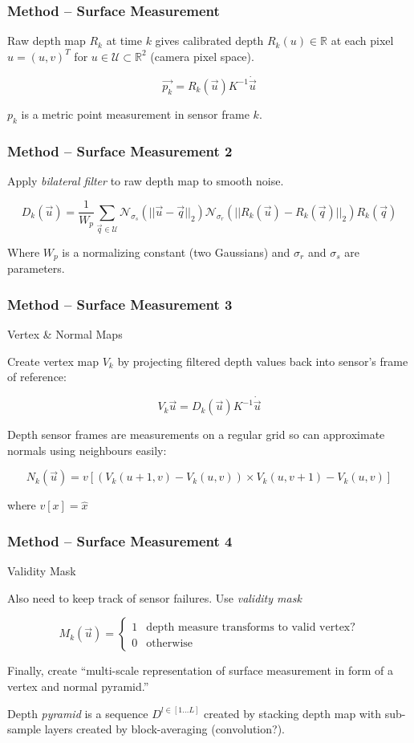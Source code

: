 \begin{frame}
\frametitle{Method -- Surface Measurement}

Raw depth map $R_k$ at time $k$ gives calibrated depth $R_k(u) \in \mathbb{R}$ at
each pixel $u = (u,v)^T$ for $u \in \mathcal{U} \subset \mathbb{R}^2$ (camera pixel space).

\[ \vec{p_k} = R_k(\vec{u})K^{-1}\dot{\vec{u}} \]

$p_k$ is a metric point measurement in sensor frame $k$.

\end{frame}

\begin{frame}
\frametitle{Method -- Surface Measurement 2}

Apply \textit{bilateral filter} to raw depth map to smooth noise.

\[ D_k(\vec{u}) = \frac{1}{W_p} \sum_{\vec{q} \in \mathcal{U}} \mathcal{N}_{\sigma_s}(||\vec{u}-\vec{q}||_2) \mathcal{N}_{\sigma_r}(||R_k(\vec{u}) - R_k(\vec{q})||_2)R_k(\vec{q}) \]

Where $W_p$ is a normalizing constant (two Gaussians) and $\sigma_r$ and $\sigma_s$ are
parameters.

\end{frame}

\begin{frame}
\frametitle{Method -- Surface Measurement 3}
{\large Vertex \& Normal Maps}

Create vertex map $V_k$ by projecting filtered depth values back into sensor's frame of reference:

\[ V_k{\vec{u}} = D_k(\vec{u})K^{-1}\dot{\vec{u}} \]

Depth sensor frames are measurements on a regular grid so can approximate normals using
neighbours easily:

\[ N_k(\vec{u}) = v\left[(V_k(u+1, v) - V_k(u,v)) \times V_k(u, v+1) - V_k(u,v)\right] \]

where $v[x] = \hat{x}$
\end{frame}

\begin{frame}
\frametitle{Method -- Surface Measurement 4}
{\large Validity Mask}

Also need to keep track of sensor failures. Use \textit{validity mask}

\[ M_k(\vec{u}) = \begin{cases} 1 & \text{depth measure transforms to valid vertex?} \\
  0 & \text{otherwise} \end{cases} \]

Finally, create ``multi-scale representation of surface measurement in form of a vertex and
normal pyramid.''

Depth \textit{pyramid} is a sequence $D^{l \in [1 \dots L ]}$ created by stacking
depth map with sub-sample layers created by block-averaging (convolution?).
\end{frame}

